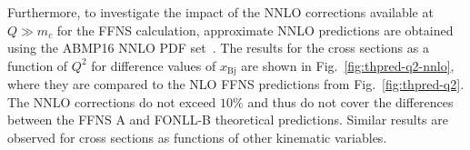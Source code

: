 \documentclass[pdftex,twocolumn,epjc3]{svjour3}          %
\newcommand{\abmp} {ABMP16\xspace}
\newcommand{\xbj}{\ensuremath{x_{\text{Bj}}}\xspace}
\newcommand{\fonll} {{FONLL-B}\xspace}
\newcommand{\ffns} {{FFNS A}\xspace}
\newcommand{\ffnsb} {{FFNS B}\xspace}
\newcommand{\ffthreea} {{HERAPDF2.0 FF3A}\xspace}
\newcommand{\ffthreeb} {{HERAPDF2.0 FF3B}\xspace}
\begin{document}
%
%

Furthermore, to investigate the impact of the NNLO corrections available at $Q \gg m_c$ for the FFNS calculation, approximate NNLO predictions are obtained using the \abmp NNLO PDF set~\cite{Alekhin:2017kpj}. The results for the cross sections as a function of $Q^2$ for difference values of \xbj are shown in Fig.~\ref{fig:thpred-q2-nnlo}, where they are compared to the NLO FFNS predictions from Fig.~\ref{fig:thpred-q2}. The NNLO corrections do not exceed $10\%$ and thus do not cover the differences between the \ffns and \fonll theoretical predictions. Similar results are observed for cross sections as functions of other kinematic variables.
\end{document}
